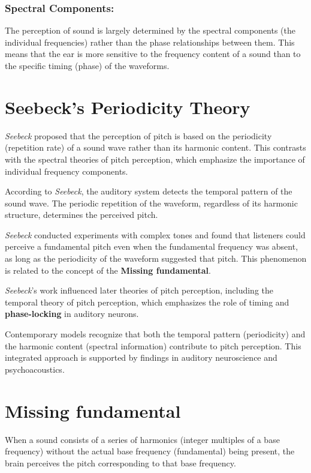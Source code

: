 \documentclass{article}
\begin{document}
\subsubsection{Spectral Components:}
The perception of sound is largely determined by the spectral components (the individual frequencies) rather than the phase relationships between them. This means that the ear is more sensitive to the frequency content of a sound than to the specific timing (phase) of the waveforms.


\section{Seebeck's Periodicity Theory}

\textit{Seebeck} proposed that the perception of pitch is based on the periodicity (repetition rate) of a sound wave rather than its harmonic content. This contrasts with the spectral theories of pitch perception, which emphasize the importance of individual frequency components.

According to \textit{Seebeck}, the auditory system detects the temporal pattern of the sound wave. The periodic repetition of the waveform, regardless of its harmonic structure, determines the perceived pitch.

\textit{Seebeck} conducted experiments with complex tones and found that listeners could perceive a fundamental pitch even when the fundamental frequency was absent, as long as the periodicity of the waveform suggested that pitch. This phenomenon is related to the concept of the \textbf{Missing fundamental}.

\textit{Seebeck}'s work influenced later theories of pitch perception, including the temporal theory of pitch perception, which emphasizes the role of timing and \textbf{phase-locking} in auditory neurons.

Contemporary models recognize that both the temporal pattern (periodicity) and the harmonic content (spectral information) contribute to pitch perception. This integrated approach is supported by findings in auditory neuroscience and psychoacoustics.

\section{Missing fundamental}

When a sound consists of a series of harmonics (integer multiples of a base frequency) without the actual base frequency (fundamental) being present, the brain perceives the pitch corresponding to that base frequency.
\end{document}

